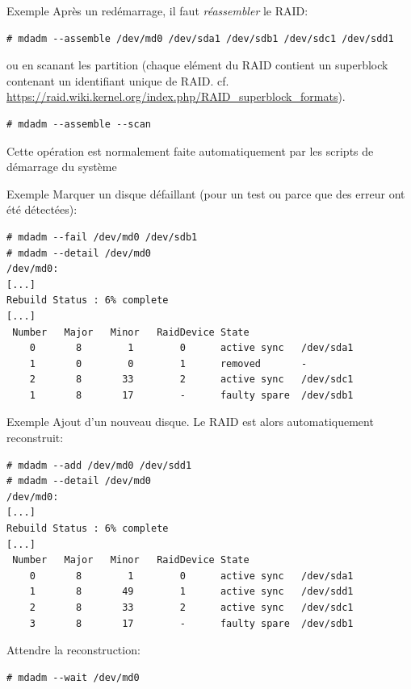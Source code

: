 \begin{frame}[fragile=singleslide]{Exemple}
  Après un redémarrage, il faut \emph{réassembler} le RAID:
  \begin{lstlisting} 
# mdadm --assemble /dev/md0 /dev/sda1 /dev/sdb1 /dev/sdc1 /dev/sdd1
  \end{lstlisting}
  ou  en scanant  les partition  (chaque elément  du RAID  contient un
  superblock      contenant     un      identifiant      unique     de
  RAID. cf. \url{https://raid.wiki.kernel.org/index.php/RAID_superblock_formats}).
  \begin{lstlisting} 
# mdadm --assemble --scan
  \end{lstlisting}
  Cette  opération  est  normalement  faite  automatiquement  par  les
  scripts de démarrage du système
\end{frame}

\begin{frame}[fragile=singleslide]{Exemple}
  Marquer un disque  défaillant (pour un test ou  parce que des erreur
  ont été détectées):
  \begin{lstlisting} 
# mdadm --fail /dev/md0 /dev/sdb1
# mdadm --detail /dev/md0
/dev/md0:
[...]
Rebuild Status : 6% complete
[...]
 Number   Major   Minor   RaidDevice State
    0       8        1        0      active sync   /dev/sda1
    1       0        0        1      removed       -
    2       8       33        2      active sync   /dev/sdc1
    1       8       17        -      faulty spare  /dev/sdb1
  \end{lstlisting} 
\end{frame}

\begin{frame}[fragile=singleslide]{Exemple}
  Ajout  d'un  nouveau  disque.   Le RAID  est  alors  automatiquement
  reconstruit:
  \begin{lstlisting} 
# mdadm --add /dev/md0 /dev/sdd1
# mdadm --detail /dev/md0
/dev/md0:
[...]
Rebuild Status : 6% complete
[...]
 Number   Major   Minor   RaidDevice State
    0       8        1        0      active sync   /dev/sda1
    1       8       49        1      active sync   /dev/sdd1
    2       8       33        2      active sync   /dev/sdc1
    3       8       17        -      faulty spare  /dev/sdb1
  \end{lstlisting}
  Attendre la reconstruction:
  \begin{lstlisting} 
# mdadm --wait /dev/md0
  \end{lstlisting} 
\end{frame}

